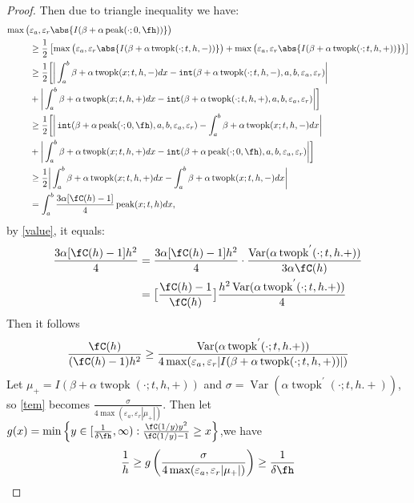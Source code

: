 \documentclass{iitthesis}
\DeclareMathOperator{\goodinteg}{\texttt{\textup{int}}}
\DeclareMathOperator{\Var}{Var}
\DeclareMathOperator{\tri}{peak}
\DeclareMathOperator{\twopk}{twopk}
\newcommand{\hcut}{\fh}
\begin{document}
\begin{proof}
Then due to triangle inequality we have:
\begin{align*}
\max \big(&\varepsilon_{a}, \varepsilon_{r}\abs{I(\beta+\alpha \tri(\cdot;0,\hcut))} \big)\\
&\ge \frac{1}{2}\left[\max \big( \varepsilon_a,\varepsilon_r\abs{I(\beta+\alpha \twopk(\cdot;t,h,-))} \big)+\max \big( \varepsilon_a,\varepsilon_r\abs{I(\beta+\alpha \twopk(\cdot;t,h,+))} \big)\right]\\
&\ge\frac{1}{2}\bigg[\bigg|\int_{a}^{b}\beta+\alpha \twopk(x;t,h,-)dx-\goodinteg(\beta+\alpha \twopk(\cdot;t,h,-),a,b,\varepsilon_{a},\varepsilon_{r})\bigg|\\
&+\bigg|\int_{a}^{b} \beta+\alpha \twopk(x;t,h,+)dx-\goodinteg(\beta+\alpha \twopk(\cdot;t,h,+),a,b,\varepsilon_{a},\varepsilon_{r})\bigg|\bigg]\\
& \ge \frac{1}{2}\bigg[\bigg|\goodinteg(\beta+\alpha \tri(\cdot;0,\hcut),a,b,\varepsilon_{a},\varepsilon_{r})-\int_{a}^{b}\beta+\alpha \twopk(x;t,h,-)dx\bigg|\\
& +\bigg|\int_{a}^{b} \beta+\alpha \twopk(x;t,h,+)dx-\goodinteg(\beta+\alpha \tri(\cdot;0,\hcut),a,b,\varepsilon_{a},\varepsilon_{r})\bigg|\bigg]\\
& \ge \frac{1}{2}\bigg|\int_{a}^{b} \beta+\alpha \twopk(x;t,h,+)dx-\int_{a}^{b}\beta+\alpha \twopk(x;t,h,-)dx\bigg|\\
& =\int_{a}^{b}\frac{3\alpha[\fC(h)-1]}{4}\tri(x;t,h)dx,
\end{align*}
by \eqref{value}, it equals:
\begin{align*}
\frac{3\alpha[\fC(h)-1]h^{2}}{4} & =\frac{3\alpha[\fC(h)-1]h^{2}}{4}\cdot\frac{\Var(\alpha\twopk^{'}(\cdot;t,h.+))}{3\alpha\fC(h)}\\
&=\big[\frac{\fC(h)-1}{\fC(h)}\big]\frac{h^{2}\Var(\alpha\twopk^{'}(\cdot;t,h.+))}{4}
\end{align*} 
Then it follows 
\begin{align}\label{tem}
\frac{\fC(h)}{(\fC(h)-1)h^{2}}\ge \frac{\Var(\alpha\twopk^{'}(\cdot;t,h.+))}{4\max(\varepsilon_{a},\varepsilon_{r}|I(\beta+\alpha \twopk(\cdot;t,h,+))|)}
\end{align}
Let $\mu_+=I(\beta+\alpha \twopk(\cdot;t,h,+))$ and $\sigma=\Var(\alpha\twopk^{'}(\cdot;t,h.+))$,
so \eqref{tem} becomes  $\frac{\sigma}{4\max(\varepsilon_{a},\varepsilon_{r}|\mu_+|)}$. Then let $g(x)=\min\left\{y \in[\frac{1}{\delta\hcut},\infty):\frac{\fC(1/y)y^2}{\fC(1/y)-1}\ge x\right\}$,we have
\begin{align*}
&\frac{1}{h}\ge g\left(\frac{\sigma}{4\max(\varepsilon_{a},\varepsilon_{r}|\mu_+|)}\right) \ge \frac{1}{\delta\hcut}\\

\end{align*}
\end{proof}
\end{document}
